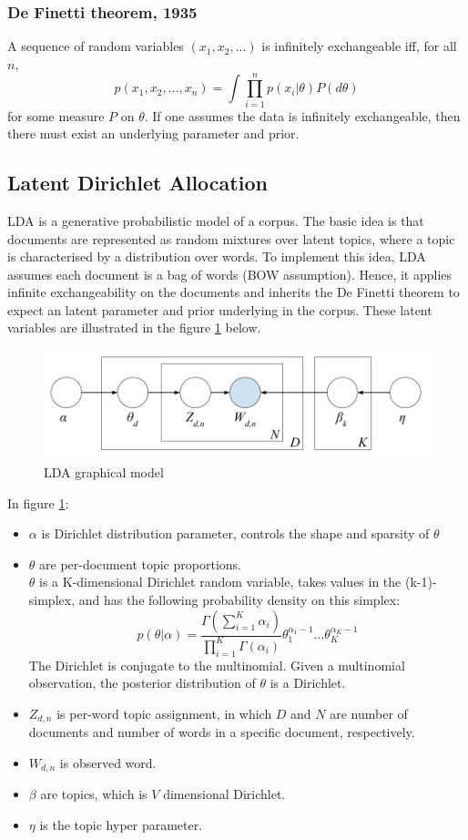 \documentclass[11pt]{article}
\begin{document}
\subsubsection{De Finetti theorem, 1935}
A sequence of random variables $(x_1,x_2,...)$ is infinitely exchangeable iff, for all $n$,
\[p(x_1,x_2,...,x_n)=\int\prod_{i=1}^{n}p(x_i|\theta)P(d\theta)\]
for some measure $P$ on $\theta$.
If one assumes the data is infinitely exchangeable, then there must exist an underlying parameter and prior.

\subsection{Latent Dirichlet Allocation} \label{lda}

LDA is a generative probabilistic model of a corpus. The basic idea is that documents are represented as random mixtures over latent topics, where a topic is characterised by a distribution over words. To implement this idea, LDA assumes each document is a bag of words (BOW assumption). Hence, it applies infinite exchangeability on the documents and inherits the De Finetti theorem to expect an latent parameter and prior underlying in the corpus. These latent variables are illustrated in the figure \ref{fig:lda_model} below.


\begin{figure}[ht]
	\centering
	\includegraphics[scale=0.3]{lda_model}
	\caption{LDA graphical model}
	\label{fig:lda_model}
\end{figure}

In figure \ref{fig:lda_model}:
\begin{itemize}
	\item $\alpha$ is Dirichlet distribution parameter, controls the shape and sparsity of $\theta$
	\item $\theta$ are per-document topic proportions.\\
	$\theta$ is a K-dimensional Dirichlet random variable, takes values in the (k-1)-simplex, and has the following probability density on this simplex:
	\[p(\theta|\alpha)=\frac{\Gamma(\sum_{i=1}^{K}\alpha_i)}{\prod_{i=1}^{K}\Gamma(\alpha_i)}\theta_1^{\alpha_1-1}\dots\theta_K^{\alpha_K-1}\]
	The Dirichlet is conjugate to the multinomial. Given a multinomial observation, the posterior distribution of $\theta$ is a Dirichlet.
	\item $Z_{d,n}$ is per-word topic assignment, in which $D$ and $N$ are number of documents and number of words in a specific document, respectively.
	\item $W_{d,n}$ is observed word.
	\item $\beta$ are topics, which is $V$ dimensional Dirichlet.
	\item $\eta$ is the topic hyper parameter.
\end{itemize}
\end{document}

